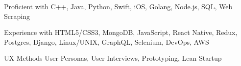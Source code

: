 

\begin{cvskills}
	
	\cvskill
	{Proficient with} %
	{C++, Java, Python, Swift, iOS, Golang, Node.js, SQL, Web Scraping}

	\cvskill
	{Experience with} %
	{HTML5/CSS3, MongoDB, JavaScript, React Native, Redux, Postgres, Django, Linux/UNIX, GraphQL, Selenium, DevOps, AWS} %
	
	\cvskill
	{UX Methods} %
	{User Personas, User Interviews, Prototyping, Lean Startup} %
	
	
\end{cvskills}
